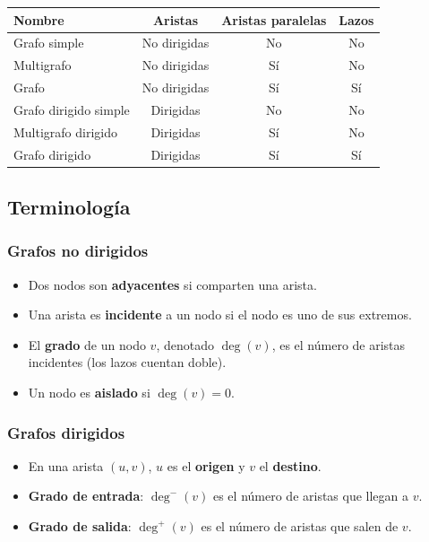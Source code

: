 \begin{center}
\begin{tabular}{lccc}
\toprule
\textbf{Nombre} & \textbf{Aristas} & \textbf{Aristas paralelas} & \textbf{Lazos} \\
\midrule
Grafo simple & No dirigidas & No & No \\
Multigrafo & No dirigidas & Sí & No \\
Grafo & No dirigidas & Sí & Sí \\
Grafo dirigido simple & Dirigidas & No & No \\
Multigrafo dirigido & Dirigidas & Sí & No \\
Grafo dirigido & Dirigidas & Sí & Sí \\
\bottomrule
\end{tabular}
\end{center}

\subsection{Terminología}

\subsubsection*{Grafos no dirigidos}
\begin{itemize}
\item Dos nodos son \textbf{adyacentes} si comparten una arista.
\item Una arista es \textbf{incidente} a un nodo si el nodo es uno de sus extremos.
\item El \textbf{grado} de un nodo $v$, denotado $\deg(v)$, es el número de aristas incidentes (los lazos cuentan doble).
\item Un nodo es \textbf{aislado} si $\deg(v) = 0$.
\end{itemize}

\subsubsection*{Grafos dirigidos}
\begin{itemize}
\item En una arista $(u,v)$, $u$ es el \textbf{origen} y $v$ el \textbf{destino}.
\item \textbf{Grado de entrada}: $\deg^{-}(v)$ es el número de aristas que llegan a $v$.
\item \textbf{Grado de salida}: $\deg^{+}(v)$ es el número de aristas que salen de $v$.
\end{itemize}




